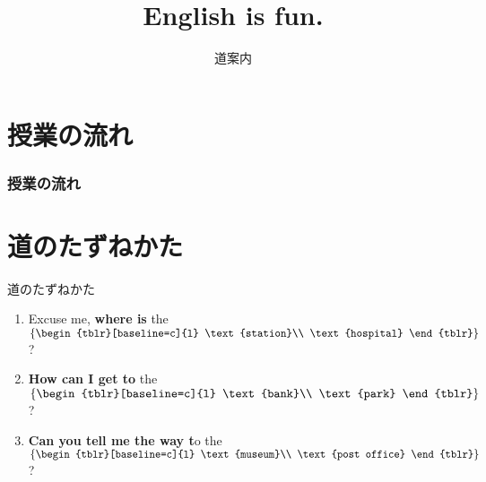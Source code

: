 \documentclass[aspectratio=169,xcolor={dvipsnames,table}]{beamer}
\title{English is fun.}
\subtitle{道案内}
\author{}
\institute[]{}
\date[]
\begin{document}
\begin{frame}[plain]
  \titlepage
\end{frame}

\section*{授業の流れ}
\begin{frame}[plain]
  \frametitle{授業の流れ}
  \tableofcontents
\end{frame}

\section{道のたずねかた}
\begin{frame}[plain]{道のたずねかた}
\begin{enumerate}
 \item Excuse me, \textbf{where is} the $\left\{\begin{tblr}[baseline=c]{l}
                                 \text{station}\\
                                 \text{hospital}
                                 \end{tblr}\right\}$ ?
 \item \textbf{How can I get to} the $\left\{\begin{tblr}[baseline=c]{l}
                                 \text{bank}\\
                                 \text{park}
                                 \end{tblr}\right\}$ ?
 \item \textbf{Can you tell me the way t}o the $\left\{\begin{tblr}[baseline=c]{l}
                                 \text{museum}\\
                                 \text{post office}
                                 \end{tblr}\right\}$ ?
\end{enumerate}

\end{frame}
\end{document}
